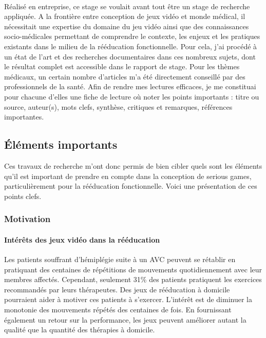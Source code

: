 \documentclass[french, 12pt]{article} %
\begin{document}
	\paragraph{}
Réalisé en entreprise, ce stage se voulait avant tout être un stage de recherche appliquée. A la frontière entre conception de jeux vidéo et monde médical, il nécessitait une expertise du
domaine du jeu vidéo ainsi que des connaissances socio-médicales permettant de comprendre le contexte, les enjeux et les pratiques existants dans le milieu de la rééducation fonctionnelle. Pour cela, j'ai procédé à un état de l'art et des recherches documentaires dans ces nombreux sujets, dont le résultat complet est accessible dans le rapport de stage.
Pour les thèmes médicaux, un certain nombre d'articles m'a été directement conseillé par des professionnels de la santé. Afin de rendre mes lectures efficaces, je me constituai pour chacune d'elles une fiche de lecture où noter les points importants : titre ou source, auteur(s), mots clefs, synthèse, critiques et remarques, références importantes.

	\subsection{Éléments importants}
Ces travaux de recherche m'ont donc permis de bien cibler quels sont les éléments qu'il est important de prendre en compte dans la conception de serious games, particulièrement pour la rééducation fonctionnelle. Voici une présentation de ces points clefs.

		\subsubsection{Motivation}
\paragraph{Intérêts des jeux vidéo dans la rééducation\\}
Les patients souffrant d'hémiplégie suite à un AVC peuvent se rétablir en pratiquant des centaines de répétitions de mouvements quotidiennement avec leur membres affectés\cite{Alan10}. Cependant, seulement 31\% des patients pratiquent les exercices recommandés par leurs thérapeutes. Des jeux de rééducation à domicile pourraient aider à motiver ces patients à s’exercer. L’intérêt est de diminuer la monotonie des mouvements répétés des centaines de fois. En fournissant également un retour sur la performance, les jeux peuvent améliorer autant la qualité que la quantité des thérapies à domicile.
\end{document}

